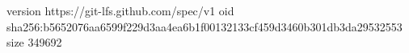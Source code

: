 version https://git-lfs.github.com/spec/v1
oid sha256:b5652076aa6599f229d3aa4ea6b1f00132133cf459d3460b301db3da29532553
size 349692
